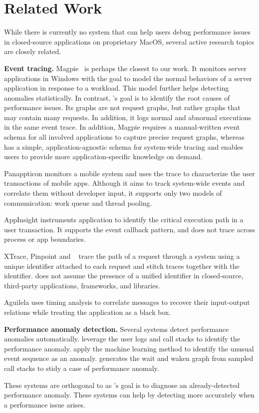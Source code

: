 \section{Related Work}
\label{sec:related-work}

While there is currently no system that can help users debug performance
issues in closed-source applications on proprietary MacOS, several active
research topics are closely related.

\textbf{Event tracing.}  Magpie~\cite{barham2004using} is perhaps the closest to
our work.  It monitors server applications in Windows with the goal to model
the normal behaviors of a server application in response to a workload.  This
model further helps detecting anomalies statistically.  In contrast, \xxx's
goal is to identify the root causes of performance issues.  Its graphs are not
request graphs, but rather graphs that may contain many requests.  In addition,
it logs normal and abnormal executions in the same event trace.  In addition,
Magpie requires a manual-written event schema for all involved applications to
capture precise request graphs, whereas \xxx has a simple, application-agnostic
schema for system-wide tracing and enables users to provide more
application-specific knowledge on demand.

Panappticon \cite{zhang2013panappticon} monitors a mobile system and uses the
trace to characterize the user transactions of mobile apps.  Although it
aims to track system-wide events and correlate them without developer
input, it supports only two models of communication: work queue and thread
pooling.

AppInsight \cite{ravindranath2012appinsight} instruments application to
identify the critical execution path in a user transaction.  It supports the
event callback pattern, and does not trace across process or app boundaries.

XTrace, Pinpoint and \etc ~\cite{fonseca2007x, chen2002pinpoint,
chow2014mystery} trace the path of a request through a system using a unique
identifier attached to each request and stitch traces together with the
identifier.  \xxx does not assume the presence of a unified identifier in
closed-source, third-party applications, frameworks, and libraries.

Aguilela \cite{aguilera2003performance} uses timing analysis to correlate
messages to recover their input-output relations while treating the application
as a black box.

\textbf{Performance anomaly detection.}  Several systems detect performance
anomalies automatically.  \cite{han2012performance, yuan2012conservative}
leverage the user logs and call stacks to identify the performance anomaly.
\cite{cohen2004correlating, saidi2008full, xu2009detecting, du2017deeplog}apply
the machine learning method to identify the unusual event sequence as an
anomaly.  \cite{yu2014comprehending} generates the wait and waken graph from
sampled call stacks to stidy a case of performance anomaly.

These systems are orthogonal to \xxx as \xxx's goal is to diagnose an
already-detected performance anomaly.  These systems can help \xxx by detecting
more accurately when a performance issue arises.

